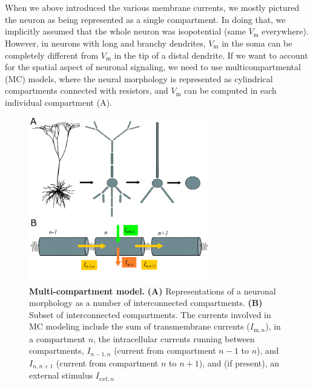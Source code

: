 \section{}
\label{sec:Neuron:morphology}
When we above introduced the various membrane currents, we mostly pictured the neuron as being represented as a single compartment. In doing that, we implicitly assumed that the whole neuron was isopotential (same $V_\mathrm{m}$ everywhere). However, in neurons with long and branchy dendrites, $V_\mathrm{m}$ in the soma can be completely different from $V_\mathrm{m}$ in the tip of a distal dendrite. If we want to account for the spatial aspect of neuronal signaling, we need to use multicompartmental (MC) models, where the neural morphology is represented as cylindrical compartments connected with resistors, and $V_\mathrm{m}$ can be computed in each individual compartment (A). 

\begin{figure}[!ht]
\begin{center}
\includegraphics[width=0.7\textwidth]{Figures/Neuron/multikompis.png}
\end{center}
\caption{\textbf{Multi-compartment model.} {\bf (A)} Representations of a neuronal morphology as a number of interconnected compartments. {\bf (B)} Subset of interconnected compartments. The currents involved in MC modeling include the sum of transmembrane currents ($I_{\mathrm{m},n}$), in a compartment $n$, the intracellular currents running between 
compartments, $I_{n-1,n}$ (current from compartment $n-1$ to $n$), and $I_{n,n+1}$ (current from compartment $n$ to $n+1$), and (if present), an external stimulus $I_{ext,n}$ 
}
\label{fig:Neuron:multikompisen}
\end{figure}

